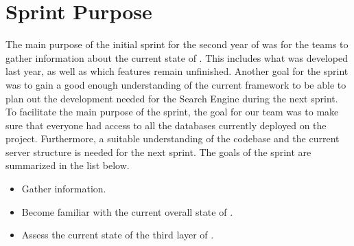 \section{Sprint Purpose}
The main purpose of the initial sprint for the second year of \knox{} was for the teams to gather information about the current state of \knox{}.
This includes what was developed last year, as well as which features remain unfinished. 
Another goal for the sprint was to gain a good enough understanding of the current framework to be able to plan out the development needed for the Search Engine during the next sprint. 
To facilitate the main purpose of the sprint, the goal for our team was to make sure that everyone had access to all the databases currently deployed on the \knox{} project. 
Furthermore, a suitable understanding of the codebase and the current server structure is needed for the next sprint.
The goals of the sprint are summarized in the list below.

\begin{itemize}
    \item Gather information.
    \item Become familiar with the current overall state of \knox{}.
    \item Assess the current state of the third layer of \knox{}.
\end{itemize}
